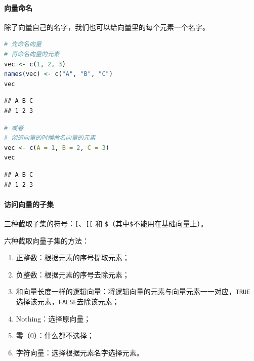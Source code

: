 \documentclass[]{ctexbook}
\providecommand{\tightlist}{%
  \setlength{\itemsep}{0pt}\setlength{\parskip}{0pt}}
\let\oldparagraph\paragraph
\renewcommand{\paragraph}[1]{\oldparagraph{#1}\mbox{}}
\newcommand{\passthrough}[1]{#1}
\begin{document}
\hypertarget{ux5411ux91cfux547dux540d}{%
\paragraph{向量命名}\label{ux5411ux91cfux547dux540d}}

除了向量自己的名字，我们也可以给向量里的每个元素一个名字。

\begin{lstlisting}[language=R]
# 先命名向量
# 再命名向量的元素
vec <- c(1, 2, 3)
names(vec) <- c("A", "B", "C")
vec
\end{lstlisting}

\begin{lstlisting}
## A B C 
## 1 2 3
\end{lstlisting}

\begin{lstlisting}[language=R]
# 或者
# 创造向量的时候命名向量的元素
vec <- c(A = 1, B = 2, C = 3)
vec
\end{lstlisting}

\begin{lstlisting}
## A B C 
## 1 2 3
\end{lstlisting}

\hypertarget{ux8bbfux95eeux5411ux91cfux7684ux5b50ux96c6}{%
\paragraph{访问向量的子集}\label{ux8bbfux95eeux5411ux91cfux7684ux5b50ux96c6}}

三种截取子集的符号：\passthrough{\lstinline![!}、\passthrough{\lstinline![[!} 和 \passthrough{\lstinline!$!}（其中\passthrough{\lstinline!$!}不能用在基础向量上）。

六种截取向量子集的方法：

\begin{enumerate}
\def\labelenumi{\arabic{enumi}.}
\tightlist
\item
  正整数：根据元素的序号提取元素；
\item
  负整数：根据元素的序号去除元素；
\item
  和向量长度一样的逻辑向量：将逻辑向量的元素与向量元素一一对应，\passthrough{\lstinline!TRUE!} 选择该元素，\passthrough{\lstinline!FALSE!}去除该元素；
\item
  Nothing：选择原向量；
\item
  零（0）：什么都不选择；
\item
  字符向量：选择根据元素名字选择元素。
\end{enumerate}
\end{document}
